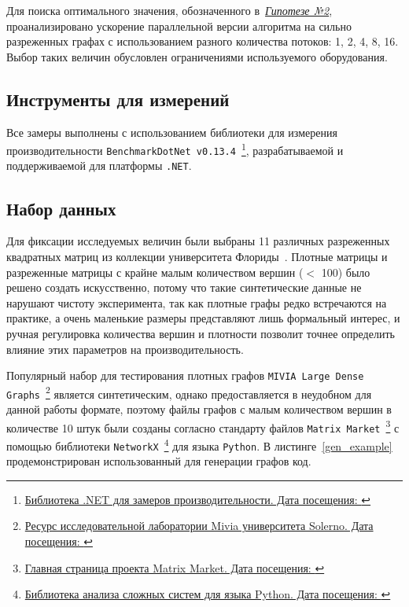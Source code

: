 Для поиска оптимального значения, обозначенного в~\hyperref[t2]{\textit{Гипотезе №2}}, проанализировано ускорение параллельной версии алгоритма на сильно разреженных графах с использованием разного количества потоков: 1, 2, 4, 8, 16. Выбор таких величин обусловлен ограничениями используемого оборудования.



\subsection{Инструменты для измерений}
Все замеры выполнены с использованием библиотеки для измерения производительности \texttt{BenchmarkDotNet v0.13.4}~\footnote{\href{https://benchmarkdotnet.org/}{Библиотека .NET для замеров производительности. Дата посещения: }}, разрабатываемой и поддерживаемой для платформы \texttt{.NET}.



\subsection{Набор данных}
Для фиксации исследуемых величин были выбраны 11 различных разреженных квадратных матриц из коллекции университета Флориды~\cite{matrixData}. Плотные матрицы и разреженные матрицы с крайне малым количеством вершин ($<$ 100) было решено создать искусственно, потому что такие синтетические данные не нарушают чистоту эксперимента, так как плотные графы редко встречаются на практике, а очень маленькие размеры представляют лишь формальный интерес, и ручная регулировка количества вершин и плотности позволит точнее определить влияние этих параметров на производительность.

Популярный набор для тестирования плотных графов \texttt{MIVIA Large Dense Graphs}~\footnote{\href{https://mivia.unisa.it/datasets/graph-database/mivia2-graph-database/}{Ресурс исследовательной лаборатории Mivia университета Solerno. Дата посещения: }} является синтетическим, однако предоставляется в неудобном для данной работы формате, поэтому файлы графов с малым количеством вершин в количестве 10 штук были созданы согласно стандарту файлов \texttt{Matrix Market}~\footnote{\href{https://math.nist.gov/MatrixMarket/}{Главная страница проекта Matrix Market. Дата посещения: }} с помощью библиотеки \texttt{NetworkX}~\footnote{\href{https://networkx.org/}{Библиотека анализа сложных систем для языка Python. Дата посещения: }} для языка \texttt{Python}. В листинге~\ref{gen_example} продемонстрирован использованный для генерации графов код.

